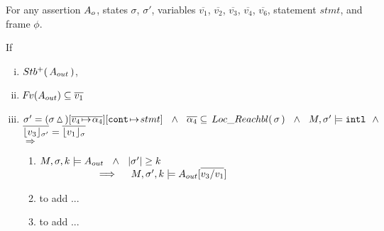 \begin{lemma}
\label{l:calls:return}

For any assertion $\Ao$, states $\sigma$, $\sigma'$,  
variables  $\overline{v_1}$,    $\overline{v_2}$,  $\overline{v_3}$,  $\overline{v_4}$,  $\overline{v_6}$,  %
statement $stmt$, and frame $\phi$.

\noindent
If 
\begin{enumerate}[(i)]
\item 
\label{l:calls:r:one}
$ \Pos \Aout$,  
\item 
\label{l:callers:r:two}
$\fv(\Aout) \subseteq  \overline{v_1} $
\item
\label{l:callers:three}
$\sigma'= (\sigma \popSymbol)[\overline{ v_4\! \mapsto\! \alpha_4}][\prg{cont}\!\mapsto\! stmt]
\ \ \wedge \ \  \overline {\alpha_4} \subseteq \LRelevantO \sigma  \ \ \wedge \ \  M, \sigma' \models \intThis
 \ \ \wedge $\\
 $ \overline {\interpret {\sigma'}  {v_3} } = \overline {\interpret {\sigma} {v_1} }$ 
\\ 
$\Longrightarrow$
 

\begin{enumerate}
\item
\label{l:calls:caller:one}
$\satDAssertFrom M  \sigma k   \Aout  \ \  \wedge\ \ \DepthSt {\sigma'} \geq k  \ 
$ \\ 
$\strut \hspace{2cm}  \hfill \Longrightarrow  \ \ \  \   \satDAssertFrom M  {\sigma'} k   {\Aout[\overline {v_3 / v_1}]  }$ 

\item
to add ...

\item
to add ...
%
%
 \end{enumerate}
\end{enumerate}

\end{lemma}



